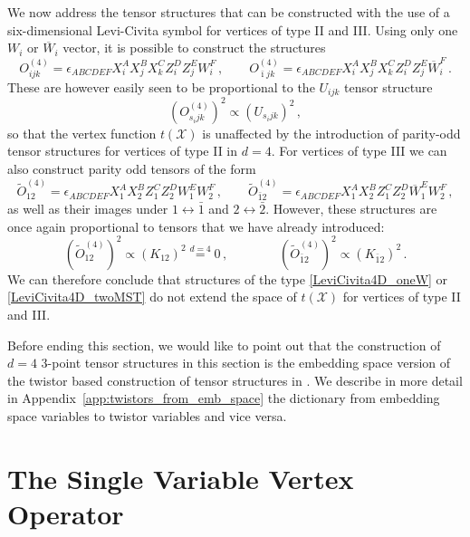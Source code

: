 \documentclass{article}
\begin{document}
We now address the tensor structures 
that can be constructed with the use of a six-dimensional Levi-Civita symbol for 
vertices of type II and III. Using only one $W_i$ or $\overline{W}_i$ vector, it is possible to 
construct the structures
\begin{equation} 
O^{(4)}_{ijk} = \epsilon_{ABCDEF}X_i^A X_j^B 
X_k^C Z_i^D Z_j^E W_i^F\,, \qquad O^{(4)}_{\bar{\imath}jk} = \epsilon_{ABCDEF}X_i^A X_j^B 
X_k^C Z_i^D Z_j^E \overline{W}_i^F\,.
\label{LeviCivita4D_oneW}
\end{equation} 
These are however easily seen to be proportional to the $U_{ijk}$ tensor 
structure
\begin{equation}
    \left(O^{(4)}_{s_i jk}\right)^2\propto \left(U_{s_i jk}\right)^2\,,
\end{equation}
so that the vertex function $t(\mathcal{X})$ is unaffected by the introduction
of parity-odd tensor structures for vertices of type II in $d=4$. For vertices 
of type III we can also construct parity odd tensors of the form
\begin{equation}
    \widetilde{O}^{(4)}_{12} = \epsilon_{ABCDEF}X_1^A X_2^B 
Z_1^C Z_2^D W_1^E W_2^F\,, \qquad \widetilde{O}^{(4)}_{\bar{1}2} = 
\epsilon_{ABCDEF}X_1^A X_2^B 
Z_1^C Z_2^D \overline{W}_1^E W_2^F\,,
\label{LeviCivita4D_twoMST}
\end{equation}
as well as their images under $1\leftrightarrow \bar{1}$ 
and $2\leftrightarrow \bar{2}$. However, these structures are once again proportional 
to tensors that we have already introduced:
\begin{equation}
    \left(\widetilde{O}^{(4)}_{12}\right)^2\propto
    \left(K_{12}\right)^2\stackrel{d=4}{=}0\,, \qquad \qquad
    \left(\widetilde{O}^{(4)}_{\bar{1}2}\right)^2\propto \left(K_{\bar{1}2}\right)^2\,.
\end{equation}
We can therefore conclude that structures of the type
\eqref{LeviCivita4D_oneW} or 
\eqref{LeviCivita4D_twoMST} do not extend the space of $t(\mathcal{X})$ for vertices of type II and III.

Before ending this section, we would like to point out that the construction of $d=4$ 3-point tensor structures in this section is the embedding space version of the twistor based construction of tensor structures in \cite{SimmonsDuffin:2012uy,
Elkhidir:2014woa}. We describe in more detail
in Appendix~\ref{app:twistors_from_emb_space} the 
dictionary from embedding space variables to twistor variables 
and vice versa.


\section{The Single Variable Vertex Operator} 
\label{sect:ConstructionOperator}
\end{document}
